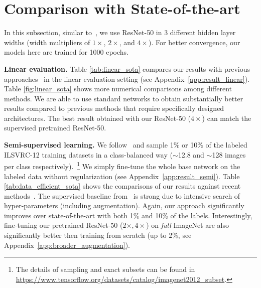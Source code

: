\documentclass{article}
\begin{document}
\section{Comparison with State-of-the-art}
In this subsection, similar to~\citet{kolesnikov2019revisiting,he2019momentum}, we use ResNet-50 in 3 different hidden layer widths (width multipliers of $1\times$, $2\times$, and $4\times$). For better convergence, our models here are trained for 1000 epochs.

\textbf{Linear evaluation.} Table \ref{tab:linear_sota} compares our results with previous approaches~\cite{zhuang2019local,he2019momentum,misra2019self,henaff2019data,kolesnikov2019revisiting,donahue2019large,bachman2019learning,tian2019contrastive} in the linear evaluation setting (see Appendix~\ref{app:result_linear}). Table \ref{fig:linear_sota} shows more numerical comparisons among different methods. We are able to use standard networks to obtain substantially better results compared to previous methods that require specifically designed architectures. The best result obtained with our ResNet-50 ($4\times$) can match the supervised pretrained ResNet-50.

\textbf{Semi-supervised learning.} We follow~\citet{zhai2019s4l} and sample 1\% or 10\% of the labeled ILSVRC-12 training datasets in a class-balanced way ($\sim$12.8 and $\sim$128 images per class respectively).~\footnote{The details of sampling and exact subsets can be found in \href{https://www.tensorflow.org/datasets/catalog/imagenet2012\_subset}{https://www.tensorflow.org/datasets/catalog/imagenet2012\_subset}.} We simply fine-tune the whole base network on the labeled data without regularization (see Appendix~\ref{app:result_semi}). Table \ref{tab:data_efficient_sota} shows the comparisons of our results against recent methods~\cite{zhai2019s4l,xie2019unsupervised,sohn2020fixmatch,wu2018unsupervised,donahue2019large,misra2019self,henaff2019data}. The supervised baseline from~\cite{zhai2019s4l} is strong due to intensive search of hyper-parameters (including augmentation). Again, our approach significantly improves over state-of-the-art with both 1\% and 10\% of the labels. Interestingly, fine-tuning our pretrained ResNet-50 (2$\times, 4\times$) on \textit{full} ImageNet are also significantly better then training from scratch (up to 2\%, see Appendix~\ref{app:broader_augmentation}).
\end{document}
